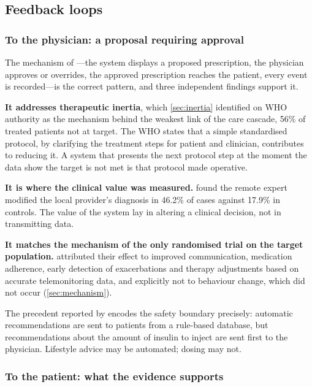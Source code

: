 \documentclass[12pt,a4paper,oneside]{report}
\begin{document}
\subsection{Feedback loops}\label{sec:feedback}

\subsubsection{To the physician: a proposal requiring approval}

The mechanism of \textcite{yazdani2018}---the system displays a proposed prescription, the physician approves or overrides, the approved prescription reaches the patient, every event is recorded---is the correct pattern, and three independent findings support it.

\textbf{It addresses therapeutic inertia}, which \cref{sec:inertia} identified on WHO authority as the mechanism behind the weakest link of the care cascade, 56\% of treated patients not at target. The WHO states that a simple standardised protocol, by clarifying the treatment steps for patient and clinician, contributes to reducing it. A system that presents the next protocol step at the moment the data show the target is not met is that protocol made operative.

\textbf{It is where the clinical value was measured.} \Textcite{bediang2021} found the remote expert modified the local provider's diagnosis in 46.2\% of cases against 17.9\% in controls. The value of the system lay in altering a clinical decision, not in transmitting data.

\textbf{It matches the mechanism of the only randomised trial on the target population.} \Textcite{mihevc2025} attributed their effect to improved communication, medication adherence, early detection of exacerbations and therapy adjustments based on accurate telemonitoring data, and explicitly not to behaviour change, which did not occur (\cref{sec:mechanism}).

The precedent reported by \textcite{yazdani2018} encodes the safety boundary precisely: automatic recommendations are sent to patients from a rule-based database, but recommendations about the amount of insulin to inject are sent first to the physician. Lifestyle advice may be automated; dosing may not.

\subsubsection{To the patient: what the evidence supports}
\end{document}
